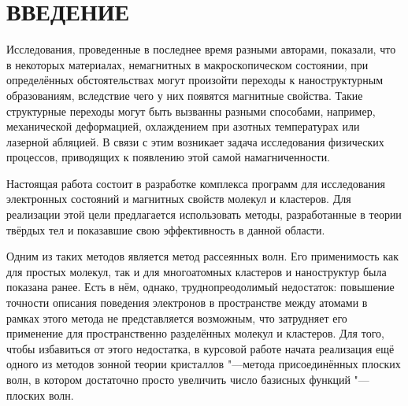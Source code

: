 \chapter*{ВВЕДЕНИЕ}                         %



Исследования, проведенные в последнее время разными
авторами\cite{localNerds1}\cite{localNerds2}\cite{SUNDARESAN200996}\cite{Venkatesan2004}, показали,
что в некоторых материалах, немагнитных в макроскопическом состоянии, при определённых обстоятельствах могут произойти
переходы к наноструктурным образованиям, вследствие чего у них появятся магнитные свойства. Такие структурные переходы
могут быть вызванны разными способами, например, механической деформацией, охлаждением при азотных температурах или
лазерной абляцией. В связи с этим возникает задача исследования физических процессов, приводящих к появлению этой
самой намагниченности.

Настоящая работа состоит в разработке комплекса программ для исследования электронных состояний и магнитных свойств
молекул и кластеров. Для реализации этой цели предлагается использовать методы, разработанные в теории твёрдых тел
и показавшие свою эффективность в данной области.

Одним из таких методов является метод рассеянных волн\cite{sw-method}. Его применимость как для
простых молекул, так и для многоатомных кластеров и наноструктур была показана
ранее\cite{nyavro}. Есть в нём, однако, труднопреодолимый недостаток: повышение точности описания поведения
электронов в пространстве между атомами в рамках этого метода не представляется
возможным, что затрудняет его применение для пространственно разделённых молекул
и кластеров. Для того, чтобы избавиться от этого недостатка, в курсовой работе
начата реализация ещё одного из методов зонной теории кристаллов "---метода
присоединённых плоских волн\cite{afw-method}, в котором достаточно просто увеличить число
базисных функций "---плоских волн.

